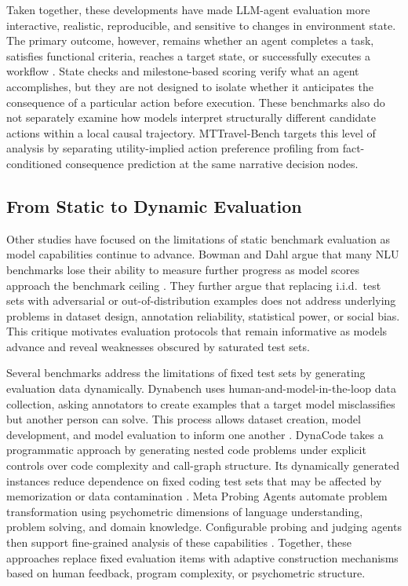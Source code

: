\documentclass[pdflatex,sn-mathphys-num]{sn-jnl}%
\theoremstyle{thmstyleone}%
\theoremstyle{thmstyletwo}%
\theoremstyle{thmstylethree}%
\begin{document}
Taken together, these developments have made LLM-agent evaluation more interactive, realistic, reproducible, and sensitive to changes in environment state. The primary outcome, however, remains whether an agent completes a task, satisfies functional criteria, reaches a target state, or successfully executes a workflow \cite{xie2024osworld,trivedi2024appworld,yao2024bench,lu2024toolsandbox,xu2024theagentcompany}. State checks and milestone-based scoring verify what an agent accomplishes, but they are not designed to isolate whether it anticipates the consequence of a particular action before execution. These benchmarks also do not separately examine how models interpret structurally different candidate actions within a local causal trajectory. MTTravel-Bench targets this level of analysis by separating utility-implied action preference profiling from fact-conditioned consequence prediction at the same narrative decision nodes.

\subsection{From Static to Dynamic Evaluation}
Other studies have focused on the limitations of static benchmark evaluation as model capabilities continue to advance. Bowman and Dahl argue that many NLU benchmarks lose their ability to measure further progress as model scores approach the benchmark ceiling \cite{bowman2021take}. They further argue that replacing i.i.d.\ test sets with adversarial or out-of-distribution examples does not address underlying problems in dataset design, annotation reliability, statistical power, or social bias. This critique motivates evaluation protocols that remain informative as models advance and reveal weaknesses obscured by saturated test sets.

Several benchmarks address the limitations of fixed test sets by generating evaluation data dynamically. Dynabench uses human-and-model-in-the-loop data collection, asking annotators to create examples that a target model misclassifies but another person can solve. This process allows dataset creation, model development, and model evaluation to inform one another \cite{kiela2021dynabench}. DynaCode takes a programmatic approach by generating nested code problems under explicit controls over code complexity and call-graph structure. Its dynamically generated instances reduce dependence on fixed coding test sets that may be affected by memorization or data contamination \cite{hu2025dynacode}. Meta Probing Agents automate problem transformation using psychometric dimensions of language understanding, problem solving, and domain knowledge. Configurable probing and judging agents then support fine-grained analysis of these capabilities \cite{zhu2024dynamic}. Together, these approaches replace fixed evaluation items with adaptive construction mechanisms based on human feedback, program complexity, or psychometric structure.
\end{document}
